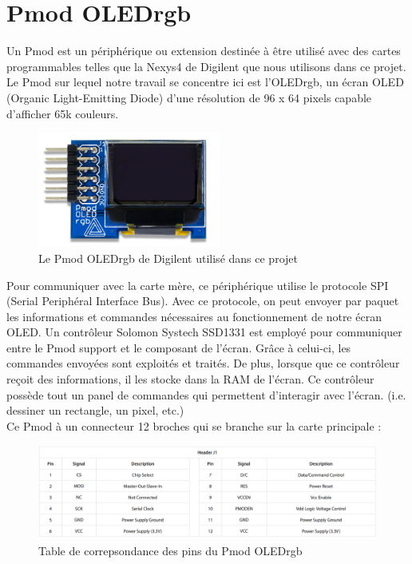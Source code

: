 \documentclass[11pt]{article}
\begin{document}
\clearpage

\section{Pmod OLEDrgb}

Un Pmod est un périphérique ou extension destinée à être utilisé avec des cartes programmables telles que la Nexys4 de Digilent que nous utilisons dans ce projet. Le Pmod sur lequel notre travail se concentre ici est l'OLEDrgb, un écran OLED (Organic Light-Emitting Diode) \cite{oleddef} d'une résolution de 96 x 64 pixels capable d'afficher 65k couleurs. 

\begin{figure}[H]
\begin{center}
\includegraphics[width = 6cm]{pmodoledrgb-1.png}
\caption{Le Pmod OLEDrgb de Digilent utilisé dans ce projet}
\end{center}
\end{figure}

Pour communiquer avec la carte mère, ce périphérique utilise le protocole SPI (Serial Periphéral Interface Bus). Avec ce protocole, on peut envoyer par paquet les informations et commandes nécessaires au fonctionnement de notre écran OLED. 
Un contrôleur Solomon Systech SSD1331 \cite{ssd1331} est employé pour communiquer entre le Pmod support et le composant de l'écran. Grâce à celui-ci, les commandes envoyées sont exploités et traités. De plus, lorsque que ce contrôleur reçoit des informations, il les stocke dans la RAM de l'écran. Ce contrôleur possède tout un panel de commandes qui permettent d'interagir avec l'écran. (i.e. dessiner un rectangle, un pixel, etc.)\\

Ce Pmod à un connecteur 12 broches qui se branche sur la carte principale :

\begin{figure}[H]
    \begin{center}
        \includegraphics[scale = 0.4, keepaspectratio]{Oled_pin_tab.png}
        \caption{Table de correpsondance des pins du Pmod OLEDrgb \cite{oledrgb}}
    \end{center}
\end{figure}
\end{document}
